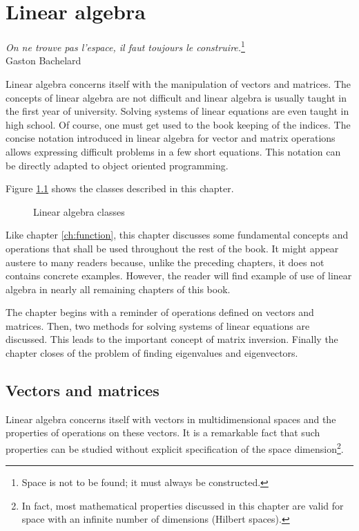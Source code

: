 \documentclass[twoside]{book}
\begin{document}
\fi

\chapter{Linear algebra}
\label{ch:linearalgebra}
\begin{flushright}
{\sl On ne trouve pas l'espace, il faut toujours le
construire.}\footnote{Space is not to be found; it must always be
constructed.}\\ Gaston Bachelard
\end{flushright}
\vspace{1 ex} Linear algebra concerns itself with the manipulation
of vectors and matrices. The concepts of linear algebra are not
difficult and linear algebra is usually taught in the first year
of university. Solving systems of linear equations are even taught
in high school. Of course, one must get used to the book keeping
of the indices. The concise notation introduced in linear algebra
for vector and matrix operations allows expressing difficult
problems in a few short equations. This notation can be directly
adapted to object oriented programming.

Figure \ref{fig:linearalgebraclasses} shows the classes described
in this chapter.
\begin{figure}
\center{}
\caption{Linear algebra classes}\label{fig:linearalgebraclasses}
\end{figure}
Like chapter \ref{ch:function}, this chapter discusses some
fundamental concepts and operations that shall be used throughout
the rest of the book. It might appear austere to many readers
because, unlike the preceding chapters, it does not contains
concrete examples. However, the reader will find example of use of
linear algebra in nearly all remaining chapters of this book.

The chapter begins with a reminder of operations defined on
vectors and matrices. Then, two methods for solving systems of
linear equations are discussed. This leads to the important
concept of matrix inversion. Finally the chapter closes of the
problem of finding eigenvalues and eigenvectors.

\section{Vectors and matrices}
\label{sec:linearalgebra} Linear algebra concerns itself with
vectors in multidimensional spaces and the properties of
operations on these vectors. It is a remarkable fact that such
properties can be studied without explicit specification of the
space dimension\footnote{In fact, most mathematical properties
discussed in this chapter are valid for space with an infinite
number of dimensions (Hilbert spaces).}.
\end{document}
